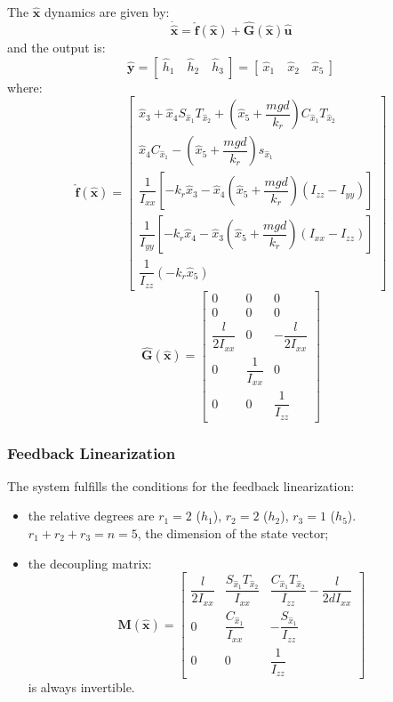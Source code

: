 \documentclass[11pt,a4paper]{scrartcl}
\begin{document}
The $ \mathbf{\hat{x}} $ dynamics are given by:
\begin{equation}
	\mathbf{\dot{\hat{x}}=\hat{f}(\hat{x})+\hat{G}(\hat{x})\hat{u}}
\end{equation}
and the output is:
\begin{equation}
	\mathbf{\hat{y}}= [ \ \hat{h}_1 \quad \hat{h}_2 \quad \hat{h}_3 \ ] = [ \ \hat{x}_1 \quad \hat{x}_2 \quad \hat{x}_5 \ ]
\end{equation}
where:
\renewcommand{\arraystretch}{1.6}
\begin{equation}
	\mathbf{\hat{f}(\hat{x})}=
	\begin{bmatrix}
	\hat{x}_3 + \hat{x}_4 S_{\hat{x}_1} T_{\hat{x}_2} + (\hat{x}_5 + \dfrac{mgd}{k_r}) C_{\hat{x}_1} T_{\hat{x}_2} \\
	\hat{x}_4 C_{\hat{x}_1} - (\hat{x}_5 + \dfrac{mgd}{k_r}) s_{\hat{x}_1}  \\
	\dfrac{1}{I_{xx}} [-k_r \hat{x}_3 - \hat{x}_4(\hat{x}_5 + \dfrac{mgd}{k_r}) (I_{zz} - I_{yy}) ] \\
	\dfrac{1}{I_{yy}} [-k_r \hat{x}_4 - \hat{x}_3(\hat{x}_5 + \dfrac{mgd}{k_r}) (I_{xx} - I_{zz})] \\
	\dfrac{1}{I_{zz}} (-k_r \hat{x}_5)
	\end{bmatrix}
\end{equation}
\renewcommand{\arraystretch}{1}
\begin{equation}
	\mathbf{\hat{G}(\hat{x})} =
	\begin{bmatrix}
	0 & 0 & 0 \\
	0 & 0 & 0 \\
	\dfrac{l}{2I_{xx}} & 0 & -\dfrac{l}{2I_{xx}} \\
	0 & \dfrac{1}{I_{xx}} & 0 \\
	0 & 0 & \dfrac{1}{I_{zz}}	
	\end{bmatrix}
\end{equation}


\subsubsection{Feedback Linearization}

The system fulfills the conditions for the feedback linearization:
\begin{itemize}
	\item the relative degrees are $ r_1 = 2 $ ($ h_1 $), $ r_2 = 2 $ ($ h_2 $), $ r_3 = 1 $ ($ h_5 $). $ r_1 + r_2 + r_3 = n = 5 $, the dimension of the state vector;
 
	\item the decoupling matrix:
	\begin{equation}
	\mathbf{M(\hat{x})} = 
	\begin{bmatrix}
	\dfrac{l}{2I_{xx}} & \dfrac{S_{\hat{x}_1} T_{\hat{x}_2}}{I_{xx}} & \dfrac{C_{\hat{x}_1}T_{\hat{x}_2}}{I_{zz}} -\dfrac{l}{2dI_{xx}} \\
	0 & \dfrac{C_{\hat{x}_1}}{I_{xx}} & -\dfrac{S_{\hat{x}_1}}{I_{zz}} \\
	0 & 0 & \dfrac{1}{I_{zz}} 
	\end{bmatrix}
	\end{equation}
	is always invertible.
\end{itemize}
\end{document}
